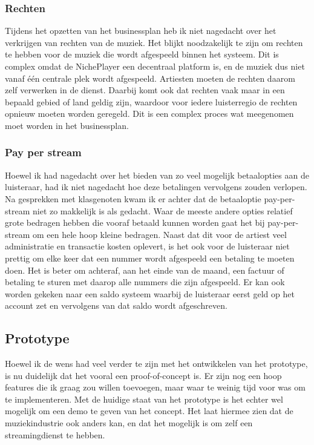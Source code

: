 \subsubsection*{Rechten}
Tijdens het opzetten van het businessplan heb ik niet nagedacht over het verkrijgen van rechten van de muziek. Het blijkt noodzakelijk te zijn om rechten te hebben voor de muziek die wordt afgespeeld binnen het systeem. Dit is complex omdat de NichePlayer een decentraal platform is, en de muziek dus niet vanaf één centrale plek wordt afgespeeld. Artiesten moeten de rechten daarom zelf verwerken in de dienst. Daarbij komt ook dat rechten vaak maar in een bepaald gebied of land geldig zijn, waardoor voor iedere luisterregio de rechten opnieuw moeten worden geregeld. Dit is een complex proces wat meegenomen moet worden in het businessplan.



\subsubsection*{Pay per stream}
Hoewel ik had nagedacht over het bieden van zo veel mogelijk betaalopties aan de luisteraar, had ik niet nagedacht hoe deze betalingen vervolgens zouden verlopen. Na gesprekken met klasgenoten kwam ik er achter dat de betaaloptie pay-per-stream niet zo makkelijk is als gedacht. Waar de meeste andere opties relatief grote bedragen hebben die vooraf betaald kunnen worden gaat het bij pay-per-stream om een hele hoop kleine bedragen. Naast dat dit voor de artiest veel administratie en transactie kosten oplevert, is het ook voor de luisteraar niet prettig om elke keer dat een nummer wordt afgespeeld een betaling te moeten doen. Het is beter om achteraf, aan het einde van de maand, een factuur of betaling te sturen met daarop alle nummers die zijn afgespeeld. Er kan ook worden gekeken naar een saldo systeem waarbij de luisteraar eerst geld op het account zet en vervolgens van dat saldo wordt afgeschreven.


\subsection{Prototype}
Hoewel ik de wens had veel verder te zijn met het ontwikkelen van het prototype, is nu duidelijk dat het vooral een proof-of-concept is. Er zijn nog een hoop features die ik graag zou willen toevoegen, maar waar te weinig tijd voor was om te implementeren. Met de huidige staat van het prototype is het echter wel mogelijk om een demo te geven van het concept. Het laat hiermee zien dat de muziekindustrie ook anders kan, en dat het mogelijk is om zelf een streamingdienst te hebben.

